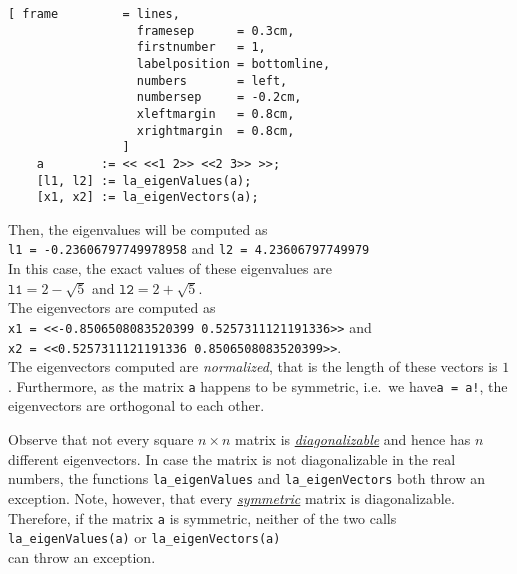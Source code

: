 \begin{Verbatim}[ frame         = lines, 
                  framesep      = 0.3cm, 
                  firstnumber   = 1,
                  labelposition = bottomline,
                  numbers       = left,
                  numbersep     = -0.2cm,
                  xleftmargin   = 0.8cm,
                  xrightmargin  = 0.8cm,
                ]
    a        := << <<1 2>> <<2 3>> >>;
    [l1, l2] := la_eigenValues(a);
    [x1, x2] := la_eigenVectors(a);
\end{Verbatim}

Then, the eigenvalues will be computed as
\\[0.2cm]
\hspace*{1.3cm}
\texttt{l1 = -0.23606797749978958} \quad and \quad \texttt{l2 = 4.23606797749979}
\\[0.2cm]
In this case, the exact values of these eigenvalues are 
\\[0.2cm]
\hspace*{1.3cm}
$\mathtt{l1} = 2 - \sqrt{5}$ \quad and \quad $\mathtt{l2} = 2 + \sqrt{5}$.
\\[0.2cm]
The eigenvectors are computed as 
\\[0.2cm]
\hspace*{1.3cm}
\texttt{x1 = <<-0.8506508083520399 0.5257311121191336>>} \quad and \\
\hspace*{1.3cm}
\texttt{x2 = <<0.5257311121191336 0.8506508083520399>>}.
\\[0.2cm]
The eigenvectors computed are \emph{normalized}, that is the length of these vectors is $1$.
Furthermore, as the matrix \texttt{a} happens to be symmetric, i.e.~we have\texttt{a = a!},
the eigenvectors are orthogonal to each other.

Observe that not every square $n \times n$ matrix is 
\href{http://en.wikipedia.org/wiki/Diagonalizable_matrix}{\emph{diagonalizable}}
and hence has $n$ different eigenvectors.  In case the matrix is not diagonalizable in the real
numbers, the functions \texttt{la\_eigenValues} and \texttt{la\_eigenVectors} both throw an
exception.  Note, however, that every 
\href{http://en.wikipedia.org/wiki/Symmetric_matrix}{\emph{symmetric}} matrix is diagonalizable.
Therefore, if the matrix \texttt{a} is symmetric, neither of the two calls
\\[0.2cm]
\hspace*{1.3cm}
\texttt{la\_eigenValues(a)} \quad or \quad \texttt{la\_eigenVectors(a)}
\\[0.2cm]
can throw an exception.





